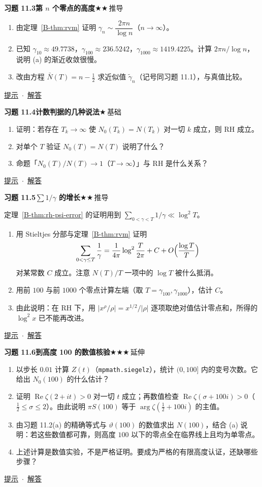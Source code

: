 \documentclass[11pt,a4paper]{article}
\renewcommand{\Re}{\operatorname{Re}}
\newcommand{\bref}[1]{\ref*{B-#1}}
\newcommand{\lvI}{$\bigstar$\,基础}
\newcommand{\lvII}{$\bigstar\bigstar$\,推导}
\newcommand{\lvIII}{$\bigstar\bigstar\bigstar$\,延伸}
\newcommand{\Q}[3]{%
  \par\addvspace{1.1em}\noindent
  \hypertarget{q:#1}{}\textbf{习题 #1}\quad\textbf{#3}\hfill{\small #2}\par
  \nopagebreak\smallskip}
\newcommand{\toHint}[1]{\hfill{\small\hyperlink{h:#1}{提示}\ $\cdot$\ \hyperlink{s:#1}{解答}}}
\begin{document}
\Q{11.3}{\lvII}{第 $n$ 个零点的高度}
\begin{enumerate}
  \item 由定理~\bref{thm:rvm} 证明 $\gamma_n\sim\dfrac{2\pi n}{\log n}$（$n\to\infty$）。
  \item 已知 $\gamma_{10}\approx49.7738$，$\gamma_{100}\approx236.5242$，$\gamma_{1000}\approx1419.4225$。计算 $2\pi n/\log n$，说明 (a) 的渐近收敛很慢。
  \item 改由方程 $\bar N(T)=n-\frac12$ 求近似值 $\tilde\gamma_n$（记号同习题 11.1），与真值比较。
\end{enumerate}
\toHint{11.3}

\Q{11.4}{\lvI}{计数判据的几种说法}
\begin{enumerate}
  \item 证明：若存在 $T_k\to\infty$ 使 $N_0(T_k)=N(T_k)$ 对一切 $k$ 成立，则 RH 成立。
  \item 对单个 $T$ 验证 $N_0(T)=N(T)$ 说明了什么？
  \item 命题「$N_0(T)/N(T)\to1$（$T\to\infty$）」与 RH 是什么关系？
\end{enumerate}
\toHint{11.4}

\Q{11.5}{\lvII}{$\sum1/\gamma$ 的增长}
定理~\bref{thm:rh-psi-error} 的证明用到 $\sum_{0<\gamma<T}1/\gamma\ll\log^2T$。
\begin{enumerate}
  \item 用 Stieltjes 分部与定理~\bref{thm:rvm} 证明
  \[
    \sum_{0<\gamma\le T}\frac1\gamma=\frac1{4\pi}\log^2\frac T{2\pi}+C+O\Bigl(\frac{\log T}{T}\Bigr)
  \]
  对某常数 $C$ 成立。注意 $N(T)/T$ 一项中的 $\log T$ 被什么抵消。
  \item 用前 $100$ 与前 $1000$ 个零点计算左端（取 $T=\gamma_{100},\gamma_{1000}$），估计 $C$。
  \item 由此说明：在 RH 下，用 $|x^\rho/\rho|=x^{1/2}/|\rho|$ 逐项取绝对值估计零点和，所得的 $\log^2x$ 已不能再改进。
\end{enumerate}
\toHint{11.5}

\Q{11.6}{\lvIII}{到高度 100 的数值核验}
\begin{enumerate}
  \item 以步长 $0.01$ 计算 $Z(t)$（\texttt{mpmath.siegelz}），统计 $(0,100]$ 内的变号次数。它给出 $N_0(100)$ 的什么估计？
  \item 证明 $\Re\zeta(2+it)>0$ 对一切 $t$ 成立；再数值检查 $\Re\zeta(\sigma+100i)>0$（$\frac12\le\sigma\le2$）。由此说明 $\pi S(100)$ 等于 $\arg\zeta(\tfrac12+100i)$ 的主值。
  \item 由习题 11.2(a) 的精确等式与 $\vartheta(100)$ 的数值求出 $N(100)$，结合 (a) 说明：若这些数值都可靠，则高度 $100$ 以下的零点全在临界线上且均为单零点。
  \item 上述计算是数值实验，不是严格证明。要成为严格的有限高度认证，还缺哪些步骤？
\end{enumerate}
\toHint{11.6}
\end{document}

